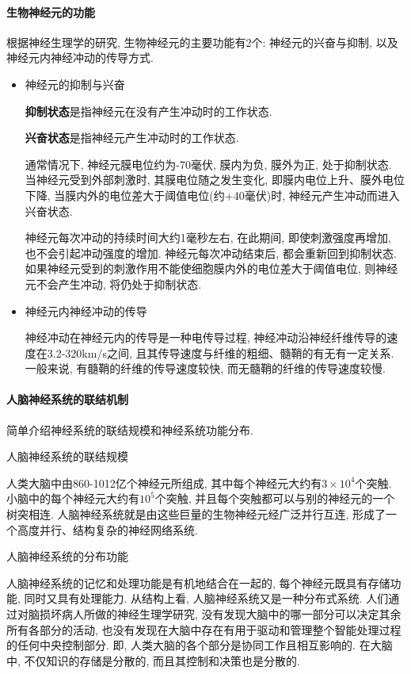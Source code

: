 \paragraph{生物神经元的功能}
根据神经生理学的研究, 生物神经元的主要功能有2个: 神经元的兴奋与抑制, 以及神经元内神经冲动的传导方式.
\begin{itemize}
\item {} 神经元的抑制与兴奋

\textbf{抑制状态}是指神经元在没有产生冲动时的工作状态.

\textbf{兴奋状态}是指神经元产生冲动时的工作状态.

通常情况下, 神经元膜电位约为-70毫伏, 膜内为负, 膜外为正, 处于抑制状态. 当神经元受到外部刺激时, 其膜电位随之发生变化, 即膜内电位上升、膜外电位下降, 当膜内外的电位差大于阈值电位(约+40毫伏)时, 神经元产生冲动而进入兴奋状态.

\begin{remark}
    神经元每次冲动的持续时间大约1毫秒左右, 在此期间, 即使刺激强度再增加, 也不会引起冲动强度的增加. 神经元每次冲动结束后, 都会重新回到抑制状态. 如果神经元受到的刺激作用不能使细胞膜内外的电位差大于阈值电位, 则神经元不会产生冲动, 将仍处于抑制状态.
\end{remark}

\item {} 神经元内神经冲动的传导

神经冲动在神经元内的传导是一种电传导过程, 神经冲动沿神经纤维传导的速度在3.2-320\si{km/s}之间, 且其传导速度与纤维的粗细、髓鞘的有无有一定关系. 一般来说, 有髓鞘的纤维的传导速度较快, 而无髓鞘的纤维的传导速度较慢.
\end{itemize}
\paragraph{人脑神经系统的联结机制} 简单介绍神经系统的联结规模和神经系统功能分布.

 人脑神经系统的联结规模

人类大脑中由860-1012亿个神经元所组成, 其中每个神经元大约有$3\times 10^4$个突触. 小脑中的每个神经元大约有$10^5$个突触, 并且每个突触都可以与别的神经元的一个树突相连. 人脑神经系统就是由这些巨量的生物神经元经广泛并行互连, 形成了一个高度并行、结构复杂的神经网络系统.

 人脑神经系统的分布功能

人脑神经系统的记忆和处理功能是有机地结合在一起的, 每个神经元既具有存储功能, 同时又具有处理能力. 从结构上看, 人脑神经系统又是一种分布式系统.
人们通过对脑损坏病人所做的神经生理学研究, 没有发现大脑中的哪一部分可以决定其余所有各部分的活动, 也没有发现在大脑中存在有用于驱动和管理整个智能处理过程的任何中央控制部分.
即, 人类大脑的各个部分是协同工作且相互影响的. 在大脑中, 不仅知识的存储是分散的, 而且其控制和决策也是分散的.
